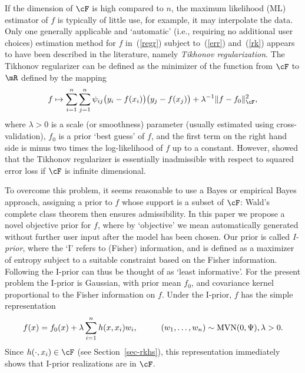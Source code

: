 \documentclass[preprint,12pt,authoryear]{elsarticle}
\DeclarePairedDelimiter{\norm}{\lVert}{\rVert}
\DeclareMathOperator{\MVN}{MVN}
\begin{document}
If the dimension of $\cF$ is high compared to $n$, the maximum likelihood (ML) estimator of $f$ is typically of little use, for example, it may interpolate the data. 
Only one generally applicable and `automatic' (i.e., requiring no additional user choices) estimation method for $f$ in~(\ref{regr}) subject to~(\ref{err}) and~(\ref{rk}) appears to have been described in the literature, namely {\em Tikhonov regularization}. The Tikhonov regularizer can be defined as the minimizer of the function from $\cF$ to $\mR$ defined by the mapping
\begin{eqnarray}\label{reg}
f \mapsto \sum_{i=1}^n\sum_{j=1}^n \psi_{ij}\big(y_i-f(x_i)\big)\big(y_j-f(x_j)\big) + \lambda^{-1}\norm{f-f_0}_{\cF}^2,
\end{eqnarray}
where $\lambda>0$ is a scale (or smoothness) parameter (usually estimated using cross-validation), $f_0$ is a prior `best guess' of $f$, and the first term on the right hand side is minus two times the log-likelihood of $f$ up to a constant.
However, \citet{cp19} showed that the Tikhonov regularizer is essentially inadmissible with respect to squared error loss if $\cF$ is infinite dimensional. 


To overcome this problem, it seems reasonable to use a Bayes or empirical Bayes approach, assigning a prior to $f$ whose support is a subset of $\cF$: Wald's complete class theorem then ensures admissibility. In this paper we propose a novel objective prior for $f$, where by `objective' we mean automatically generated without further user input after the model has been chosen. 
Our prior is called {\em I-prior}, where the `I' refers to (Fisher) information, and is defined as a maximizer of entropy subject to a suitable constraint based on the Fisher information. Following \citet{jaynes03} the I-prior can thus be thought of as `least informative'.
For the present problem the I-prior is Gaussian, with prior mean $f_0$, and covariance kernel proportional to the Fisher information on $f$. Under the I-prior, $f$ has the simple representation
\begin{eqnarray}  \label{repr}
f(x) = f_0(x) + \lambda\sum_{i=1}^n h(x,x_i)w_i, \hspace{10mm}(w_1,\ldots,w_n)\sim\MVN(0,\Psi), \lambda>0.
\end{eqnarray}
Since $h(\cdot,x_i)\in\cF$ (see Section~\ref{sec-rkhs}), this representation immediately shows that I-prior realizations are in $\cF$.
\end{document}

